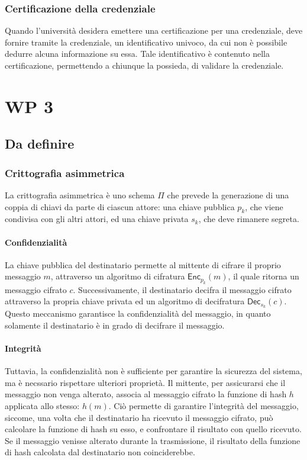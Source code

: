 \documentclass[a4paper,12pt]{article}
\begin{document}
\subsubsection{Certificazione della credenziale}
Quando l'università desidera emettere una certificazione per una credenziale, deve fornire tramite la credenziale, un identificativo univoco, da cui non è possibile dedurre alcuna informazione su essa. 
Tale identificativo è contenuto nella certificazione, permettendo a chiunque la possieda, di validare la credenziale.



\newpage
\section{WP 3}
\subsection{Da definire}
\subsubsection{Crittografia asimmetrica}
La crittografia asimmetrica è uno schema $\Pi$ che prevede la generazione di una coppia di chiavi da parte di ciascun attore: una chiave pubblica $p_k$, che viene condivisa con gli altri attori, ed una chiave privata $s_k$, che deve rimanere segreta.
\paragraph{Confidenzialità} 
La chiave pubblica del destinatario permette al mittente di cifrare il proprio messaggio $m$, attraverso un algoritmo di cifratura $\mathsf{Enc}_{p_k}(m)$, il quale ritorna un messaggio cifrato $c$. Successivamente, il destinatario decifra il messaggio cifrato attraverso la propria chiave privata ed un algoritmo di decifratura $\mathsf{Dec}_{s_k}(c)$.
Questo meccanismo garantisce la confidenzialità del messaggio, in quanto solamente il destinatario è in grado di decifrare il messaggio.
\paragraph{Integrità}
Tuttavia, la confidenzialità non è sufficiente per garantire la sicurezza del sistema, ma è necssario rispettare ulteriori proprietà.
Il mittente, per assicurarsi che il messaggio non venga alterato, associa al messaggio cifrato la funzione di hash $h$ applicata allo stesso: $h(m)$. Ciò permette di garantire l'integrità del messaggio, siccome, una volta che il destinatario ha ricevuto il messaggio cifrato, può calcolare la funzione di hash su esso, e confrontare il risultato con quello ricevuto. Se il messaggio venisse alterato durante la trasmissione, il risultato della funzione di hash calcolata dal destinatario non coinciderebbe.
\end{document}
